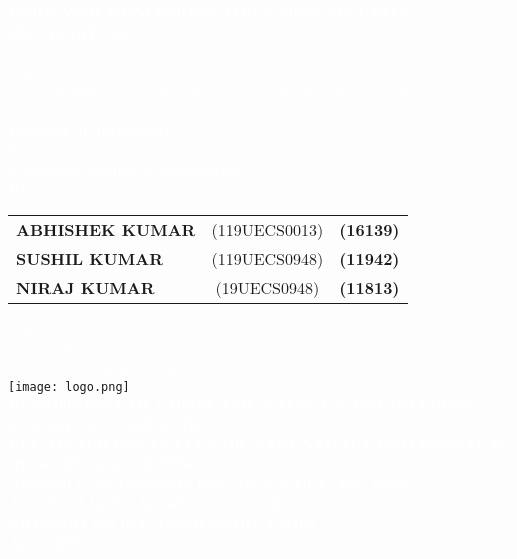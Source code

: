 \documentclass[10pt]{report}
\begin{document}
\newpage
\begin{center}
\thispagestyle{empty}
\LARGE{\textsc {\textbf{\textcolor{White}{DARK WEB MONITORING FOR CYBER SECURITY INFORMATION}}}}\\[0.2cm]
\vspace{0.2cm}
\Large{\textit{\textcolor{White}{\\Major project report submitted \\in partial fulfillment of the
requirement
for award of the degree of}}}\\[0.3cm]
\Large{\textbf{\textcolor{White}{\\Bachelor of Technology\\in \\Computer Science \& Engineering}}}
\vspace{0.5cm}
\Large{\textbf{\textcolor{White}{\\By}}}\\[0.5cm]
\begin{table}[h]
\centering
\Large{\textcolor{White}{
\begin{tabular}{>{\bfseries}lc>{\bfseries}r}
ABHISHEK KUMAR&(119UECS0013) & (16139)\\SUSHIL KUMAR & (119UECS0948)&(11942)\\NIRAJ KUMAR&(19UECS0948) & (11813)\\
\end{tabular}}}
\end{table}
\vspace{0.5cm}
\large{\textit{\textcolor{White}{Under the guidance of}}}\\
\large{\textit{\textcolor{White}{MS. M DIVYA,Degree.,\\
ASSISTANT PROFESSOR}
}}\\
\vspace{0.5cm}
\texttt{[image: logo.png]}\\
\vspace{1cm}
\large{\textbf{\textcolor{White}{DEPARTMENT OF COMPUTER SCIENCE \& ENGINEERING}}}\\

\large{\textbf{\textcolor{White}{SCHOOL OF COMPUTING}}}\\
\vspace{0.5cm}
\Large{\textbf{\textcolor{White}{VEL TECH RANGARAJAN DR. SAGUNTHALA R\&D INSTITUTE OF
SCIENCE \& TECHNOLOGY\\
\vspace{0.2cm}
(Deemed to be University Estd u/s 3 of UGC Act,
1956)}}}\\\Large{\textbf{\textcolor{White}{Accredited by NAAC with A++ Grade}}}\\
\large{\textbf{\textcolor{White}{CHENNAI 600 062, TAMILNADU, INDIA}}}
\vspace{0.4cm}
\large{\textbf{\textcolor{White}{\\April, 2023}}}\\
\pagecolor{Periwinkle}\afterpage{\nopagecolor}
\end{center}
\end{document}

